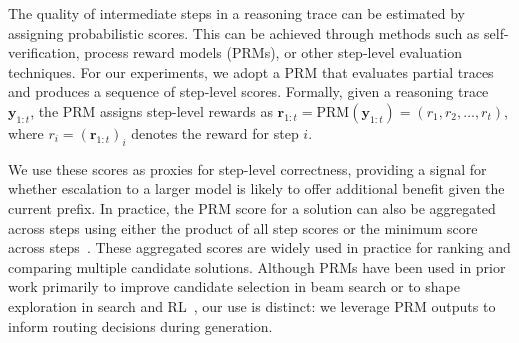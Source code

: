 \documentclass{article}
\theoremstyle{plain}
\theoremstyle{definition}
\theoremstyle{remark}
\begin{document}
The quality of intermediate steps in a reasoning trace can be estimated by assigning probabilistic scores. This can be achieved through methods such as self-verification, process reward models 
(PRMs), or other step-level evaluation techniques. For our experiments, we adopt a PRM that evaluates partial traces and produces a sequence of step-level scores. Formally, given a reasoning trace $\mathbf{y}_{1:t}$, the PRM assigns step-level rewards as $\mathbf{r}_{1:t} = \text{PRM}(\mathbf{y}_{1:t}) = (r_1, r_2, \dots, r_t)$, where $r_i = (\mathbf{r}_{1:t})_i$ denotes the reward for step $i$. 

We use these scores as proxies for step-level correctness, providing a signal for whether escalation to a larger model is likely to offer additional benefit given the current prefix.
In practice, the PRM score for a solution can also be aggregated across steps using either the product of all step scores or the minimum score across steps~\citep{mathshephard, prm800k}. These aggregated scores are widely used in practice for ranking and comparing multiple candidate solutions.  
Although PRMs have been used in prior work primarily to improve candidate selection in beam search or to shape exploration in search and RL~\citep{snell2024scaling, setlur2024rewarding},
our use is distinct: we leverage PRM outputs to inform routing decisions during generation.

\vspace{-0.2cm}
\end{document}
